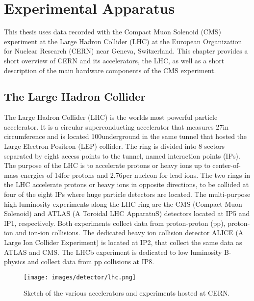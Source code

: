 \chapter{Experimental Apparatus}\label{sec:LHC}
This thesis uses data recorded with the Compact Muon Solenoid (CMS) experiment at the Large Hadron Collider (LHC) at the European Organization for Nuclear Research (CERN) near Geneva, Switzerland. 
This chapter provides a short overview of CERN and its accelerators, the LHC, as well as a short description of the main hardware components of the CMS experiment.
\section{The Large Hadron Collider}
The Large Hadron Collider (LHC) is the worlds most powerful particle accelerator\cite{Brüning:782076}. 
It is a circular superconducting accelerator that measures 27\km in circumference and is located 100\m underground in the same tunnel that hosted the Large Electron Positron (LEP) collider\cite{lep}.
The ring is divided into 8 sectors separated by eight access points to the tunnel, named interaction points (IPs). 
The purpose of the LHC is to accelerate protons or heavy ions up to center-of-mass energies of 14\TeV for protons and 2.76\TeV per nucleon for lead ions. 
The two rings in the LHC accelerate protons or heavy ions in opposite directions, to be collided at four of the eight IPs where huge particle detectors are located.
The multi-purpose high luminosity experiments along the LHC ring are the CMS (Compact Muon Solenoid) \cite{Chatrchyan:2008aa} and ATLAS (A Toroidal LHC ApparatuS) \cite{Armstrong:1994it} detectors located at IP5 and IP1, respectively. 
Both experiments collect data from proton-proton (pp), proton-ion and ion-ion collisions.
The dedicated heavy ion collision detector ALICE (A Large Ion Collider Experiment)\cite{alice} is located at IP2, that collect the same data as ATLAS and CMS. 
The LHCb\cite{CERN-LHCC-98-004} experiment is dedicated to low luminosity B-physics and collect data from pp collisions at IP8. 
\begin{figure}[!htp]
  \centering
   \texttt{[image: images/detector/lhc.png]}
   \caption{Sketch of the various accelerators and experiments hosted at CERN.}
   \label{fig:LHC}
\end{figure}                                                                                                                                                                                    
